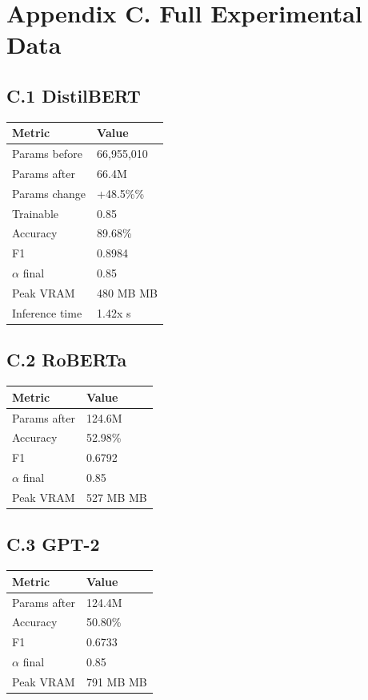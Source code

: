 \section{Appendix C. Full Experimental Data}

\subsection{C.1 DistilBERT}

\begin{table}[H]
\centering
\small
\begin{tabular}{ll}
\toprule
\textbf{Metric} & \textbf{Value} \\
\midrule
Params before & 66,955,010 \\
Params after & 66.4M \\
Params change & +48.5\%\% \\
Trainable & 0.85 \\
Accuracy & 89.68\% \\
F1 & 0.8984 \\
$\alpha$ final & 0.85 \\
Peak VRAM & 480 MB MB \\
Inference time & 1.42x s \\
\bottomrule
\end{tabular}
\end{table}

\subsection{C.2 RoBERTa}

\begin{table}[H]
\centering
\small
\begin{tabular}{ll}
\toprule
\textbf{Metric} & \textbf{Value} \\
\midrule
Params after & 124.6M \\
Accuracy & 52.98\% \\
F1 & 0.6792 \\
$\alpha$ final & 0.85 \\
Peak VRAM & 527 MB MB \\
\bottomrule
\end{tabular}
\end{table}

\subsection{C.3 GPT-2}

\begin{table}[H]
\centering
\small
\begin{tabular}{ll}
\toprule
\textbf{Metric} & \textbf{Value} \\
\midrule
Params after & 124.4M \\
Accuracy & 50.80\% \\
F1 & 0.6733 \\
$\alpha$ final & 0.85 \\
Peak VRAM & 791 MB MB \\
\bottomrule
\end{tabular}
\end{table}

